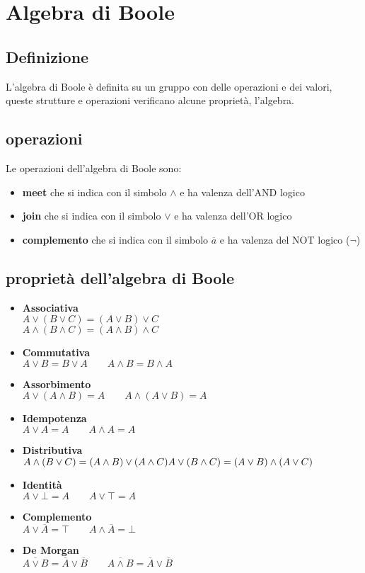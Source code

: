 \documentclass{article}
\begin{document}
\section{Algebra di Boole}
\subsection{Definizione}
L'algebra di Boole è definita su un gruppo con delle operazioni e dei valori, queste strutture e operazioni verificano alcune proprietà, l'algebra.

\subsection{operazioni}
Le operazioni dell'algebra di Boole sono:
\begin{itemize}
    \item \textbf{meet} che si indica con il simbolo $\land$ e ha valenza dell'AND logico
    \item \textbf{join} che si indica con il simbolo $\lor$ e ha valenza dell'OR logico
    \item \textbf{complemento} che si indica con il simbolo $\overline{a}$ e ha valenza del NOT logico ($\lnot$)
\end{itemize}

\subsection{proprietà dell'algebra di Boole}
\begin{itemize}
    \item \textbf{Associativa} \\ $A \lor (B \lor C) = (A \lor B) \lor C$ \\ $A \land (B \land C) = (A \land B) \land C$
    \item \textbf{Commutativa} \\ $A \lor B = B \lor A \quad\quad A \land B = B \land A$
    \item \textbf{Assorbimento} \\ $A \lor (A \land B) = A \quad\quad A \land (A \lor B) = A$
    \item \textbf{Idempotenza} \\ $A \lor A = A \quad\quad A \land A = A$
    \item \textbf{Distributiva} \\ $A \land (B \lor C) = (A \land B) \lor (A \land C) \\ A \lor (B \land C) = (A \lor B) \land (A \lor C)$
    \item \textbf{Identità} \\ $A \lor \bot = A \quad\quad A \lor \top = A$
    \item \textbf{Complemento} \\ $A \lor \overline{A} = \top \quad\quad A \land \overline{A} = \bot$
    \item \textbf{De Morgan} \\ $\overline{A \lor B} = \overline{A} \lor \overline{B} \quad\quad \overline{A \land B} = \overline{A} \lor \overline{B}$
\end{itemize}
\end{document}
